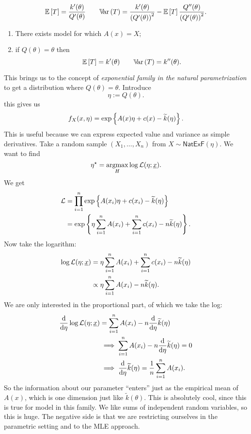 \documentclass[12pt]{report}
\begin{document}
\begin{equation*}
	\mathbb{E}\left[T\right]=\frac{k'(\theta)}{Q'(\theta)}\qquad\mathbb{V}\!\mathrm{ar}\,(T)=\frac{k'(\theta)}{\left(Q'(\theta)\right)^{2}}-\mathbb{E}\left[T\right]\frac{Q''(\theta)}{\left(Q'(\theta)\right)^{2}}.
\end{equation*} 
\begin{remark}
	\begin{enumerate}
		\item There exists model for which $A(x)=X$;
		\item if $Q(\theta)=\theta$ then
		\begin{equation*}
			\mathbb{E}\left[T\right]=k'(\theta)\qquad\mathbb{V}\!\mathrm{ar}\,(T)=k''(\theta).
		\end{equation*}
	\end{enumerate}
\end{remark}
This brings us to the concept of \emph{exponential family in the natural parametrization} to get a distribution where $Q(\theta)=\theta$.
Introduce
\begin{equation*}
	\eta:=Q(\theta).
\end{equation*}
this gives us
\begin{equation*}
	f_{X}(x,\eta)=\exp\left\{A(x)\eta+c(x)-\widetilde{k}(\eta)\right\}.
\end{equation*}
This is useful because we can express expected value and variance as simple derivatives. Take a random sample $(X_{1},\ldots,X_{n})$ from $X\sim\mathsf{NatExF}(\eta)$. We want to find
\begin{equation*}
	\eta^{\star}=\operatorname*{argmax}_{H}\log\mathcal{L}(\eta;\underline{x}).
\end{equation*}
We get
\begin{align*}
	\mathcal{L}&=\prod_{i=1}^{n}\exp\left\{A(x_{i})\eta+c(x_{i})-\widetilde{k}(\eta)\right\}\\
	&=\exp\left\{\eta\sum_{i=1}^{n}A(x_{i})+\sum_{i=1}^{n}c(x_{i})-n\widetilde{k}(\eta)\right\}.
\end{align*}
Now take the logarithm:
\begin{align*}
	\log\mathcal{L}(\eta;\underline{x})&=\eta\sum_{i=1}^{n}A(x_{i})+\sum_{i=1}^{n}c(x_{i})-n\widetilde{k}(\eta)\\
	&\propto\eta\sum_{i=1}^{n}A(x_{i})-n\widetilde{k}(\eta).
\end{align*}
We are only interested in the proportional part, of which we take the log:
\begin{align*}
	\frac{\dif}{\dif\eta}\log\mathcal{L}(\eta;\ulx)&=\sum_{i=1}^{n}A(x_{i})-n\frac{\dif}{\dif\eta}\widetilde{k}(\eta)\\
	&\implies\sum_{i=1}^{n}A(x_{i})-n\frac{\dif}{\dif\eta}\widetilde{k}(\eta)=0\\
	&\implies\frac{\dif}{\dif\eta}\widetilde{k}(\eta)=\frac{1}{n}\sum_{i=1}^{n}A(x_{i}).
\end{align*}
So the information about our parameter ``enters'' just as the empirical mean of $A(x)$, which is one dimension just like $\widetilde{k}(\theta)$. This is absolutely cool, since this is true for  model in this family. We like sums of independent random variables, so this is huge. The negative side is that we are restricting ourselves in the parametric setting and to the MLE approach.
\end{document}
